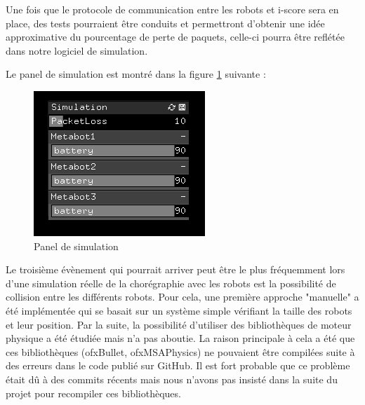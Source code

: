 Une fois que le protocole de communication entre les robots et i-score sera en place, des tests pourraient être conduits et permettront d'obtenir une idée approximative du pourcentage de perte de paquets, celle-ci pourra être reflétée dans notre logiciel de simulation.

Le panel de simulation est montré dans la figure \ref{spa} suivante :

\begin{figure}[H]
\centering
\includegraphics[scale=0.8]{imgs/spanel}
\caption{Panel de simulation}
\label{spa}
\end{figure} 

Le troisième évènement qui pourrait arriver peut être le plus fréquemment lors d'une simulation réelle de la chorégraphie avec les robots est la possibilité de collision entre les différents robots. Pour cela, une première approche "manuelle" a été implémentée qui se basait sur un système simple vérifiant la taille des robots et leur position. Par la suite, la possibilité d'utiliser des bibliothèques de moteur physique a été étudiée mais n'a pas aboutie. La raison principale à cela a été que ces bibliothèques (ofxBullet, ofxMSAPhysics) ne pouvaient être compilées suite à des erreurs dans le code publié sur GitHub. Il est fort probable que ce problème était dû à des commits récents mais nous n'avons pas insisté dans la suite du projet pour recompiler ces bibliothèques. 

